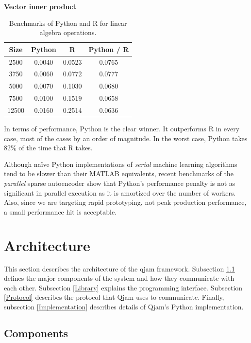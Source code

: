 \documentclass[%
  final,
  notitlepage,
  narroweqnarray,
  inline,
]{ieee}
\begin{document}
\begin{table}[h!]
\begin{center}
    \vspace{1em}
    \textbf{Vector inner product} \\
    \begin{tabular}{cccc}
      Size  & Python &  R       & Python / R \\
      \hline
      2500  & 0.0040 & 0.0523 & 0.0765 \\
      3750  & 0.0060 & 0.0772 & 0.0777 \\
      5000  & 0.0070 & 0.1030 & 0.0680 \\
      7500  & 0.0100 & 0.1519 & 0.0658 \\
      12500 & 0.0160 & 0.2514 & 0.0636 \\
    \end{tabular}
  \end{center}
  \caption{Benchmarks of Python and R for linear algebra
    operations.}
  \label{PythonvsR}
\end{table}

In terms of performance, Python is the clear winner. It outperforms R in every
case, most of the cases by an order of magnitude. In the worst case, Python
takes 82\% of the time that R takes.

Although na\"{i}ve Python implementations of {\it serial} machine learning
algorithms tend to be slower than their MATLAB equivalents, recent benchmarks
of the {\it parallel} sparse autoencoder show that Python's performance penalty
is not as significant in parallel execution as it is amortized over the number
of workers. Also, since we are targeting rapid prototyping, not peak production
performance, a small performance hit is acceptable.

\section{Architecture}

This section describes the architecture of the qjam framework. Subsection
\ref{Components} defines the major components of the system and how they
communicate with each other. Subsection \ref{Library} explains the programming
interface. Subsection \ref{Protocol} describes the protocol that Qjam uses to
communicate. Finally, subsection \ref{Implementation} describes details of
Qjam's Python implementation.

\subsection{Components}
\label{Components}
\end{document}
